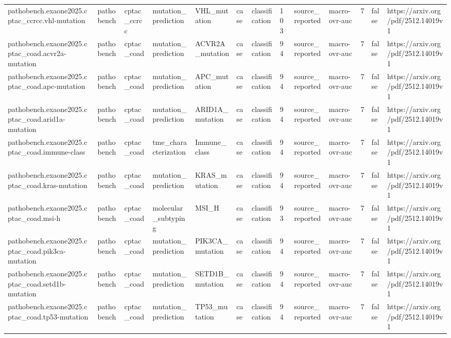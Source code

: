 \begin{longtable}{lllllllllllll}
pathobench.exaone2025.cptac\_ccrcc.vhl-mutation & pathobench & cptac\_ccrcc & mutation\_prediction & VHL\_mutation & case & classification & 103 & source\_reported & macro-ovr-auc & 7 & false & https://arxiv.org/pdf/2512.14019v1 \\
pathobench.exaone2025.cptac\_coad.acvr2a-mutation & pathobench & cptac\_coad & mutation\_prediction & ACVR2A\_mutation & case & classification & 94 & source\_reported & macro-ovr-auc & 7 & false & https://arxiv.org/pdf/2512.14019v1 \\
pathobench.exaone2025.cptac\_coad.apc-mutation & pathobench & cptac\_coad & mutation\_prediction & APC\_mutation & case & classification & 94 & source\_reported & macro-ovr-auc & 7 & false & https://arxiv.org/pdf/2512.14019v1 \\
pathobench.exaone2025.cptac\_coad.arid1a-mutation & pathobench & cptac\_coad & mutation\_prediction & ARID1A\_mutation & case & classification & 94 & source\_reported & macro-ovr-auc & 7 & false & https://arxiv.org/pdf/2512.14019v1 \\
pathobench.exaone2025.cptac\_coad.immune-class & pathobench & cptac\_coad & tme\_characterization & Immune\_class & case & classification & 94 & source\_reported & macro-ovr-auc & 7 & false & https://arxiv.org/pdf/2512.14019v1 \\
pathobench.exaone2025.cptac\_coad.kras-mutation & pathobench & cptac\_coad & mutation\_prediction & KRAS\_mutation & case & classification & 94 & source\_reported & macro-ovr-auc & 7 & false & https://arxiv.org/pdf/2512.14019v1 \\
pathobench.exaone2025.cptac\_coad.msi-h & pathobench & cptac\_coad & molecular\_subtyping & MSI\_H & case & classification & 93 & source\_reported & macro-ovr-auc & 7 & false & https://arxiv.org/pdf/2512.14019v1 \\
pathobench.exaone2025.cptac\_coad.pik3ca-mutation & pathobench & cptac\_coad & mutation\_prediction & PIK3CA\_mutation & case & classification & 94 & source\_reported & macro-ovr-auc & 7 & false & https://arxiv.org/pdf/2512.14019v1 \\
pathobench.exaone2025.cptac\_coad.setd1b-mutation & pathobench & cptac\_coad & mutation\_prediction & SETD1B\_mutation & case & classification & 94 & source\_reported & macro-ovr-auc & 7 & false & https://arxiv.org/pdf/2512.14019v1 \\
pathobench.exaone2025.cptac\_coad.tp53-mutation & pathobench & cptac\_coad & mutation\_prediction & TP53\_mutation & case & classification & 94 & source\_reported & macro-ovr-auc & 7 & false & https://arxiv.org/pdf/2512.14019v1 \\

\end{longtable}
